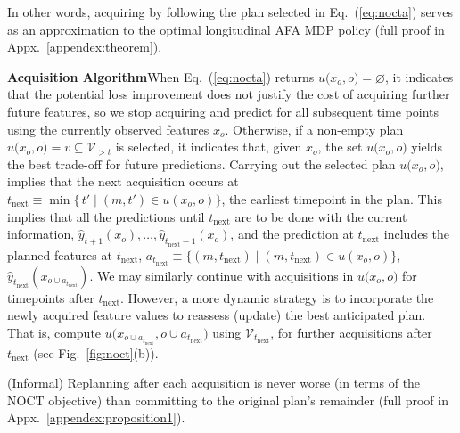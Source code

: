 In other words, acquiring by following the plan selected in Eq.~(\ref{eq:nocta}) serves as an approximation to the optimal longitudinal AFA MDP policy (full proof in Appx.~\ref{appendex:theorem}).




\textbf{Acquisition Algorithm}\quad When Eq.~(\ref{eq:nocta}) returns $u\bigl(x_o, o\bigr) = \varnothing$, it indicates that the potential loss improvement does not justify the cost of acquiring further future features, so we stop acquiring and predict for all subsequent time points using the currently observed features $x_o$. Otherwise, if a non-empty plan $u\bigl(x_o, o\bigr) = v \subseteq \mathcal{V}_{>t}$ is selected, it indicates that, given $x_o$, the set $u\bigl(x_o, o\bigr)$ yields the best trade-off for future predictions. Carrying out the selected plan $u\bigl(x_o, o\bigr)$, implies that the next acquisition occurs at $t_{\text{next} } \equiv \min\{\,t'\mid(m,t')\in u(x_o,o)\}$, the earliest timepoint in the plan. This implies that all the predictions until $t_{\text{next} }$ are to be done with the current information, $\hat{y}_{t+1}({x}_{o}), \ldots, \hat{y}_{t_{\text{next}}-1}({x}_{o})$, and the prediction at $t_{\text{next}}$ includes the planned features at $t_{\text{next}}$, $a_{t_{\text{next}}} \equiv \{(m,t_{\text{next}})\mid(m,t_{\text{next}})\in u(x_o,o)\}$, $\hat{y}_{t_{\text{next}}}({x}_{o \cup a_{t_{\text{next}}}})$. We may similarly continue with acquisitions in $u\bigl(x_o, o\bigr)$ for timepoints after $t_{\text{next}}$. However, a more dynamic strategy is to incorporate the newly acquired feature values to reassess (update) the best anticipated plan. That is, compute $u\bigl({x}_{o \cup a_{t_{\text{next}}}}, o \cup a_{t_{\text{next}}}\bigr)$ using $\mathcal{V}_{t_{\text{next}}}$, for further acquisitions after $t_{\text{next}}$ (see Fig.~\ref{fig:noct}(b)). 



\begin{proposition}
\label{prop:replanning}
(Informal) Replanning after each acquisition is never worse (in terms of the $\mathrm{NOCT}$ objective) than committing to the original plan’s remainder (full proof in Appx.~\ref{appendex:proposition1}).
\end{proposition}


